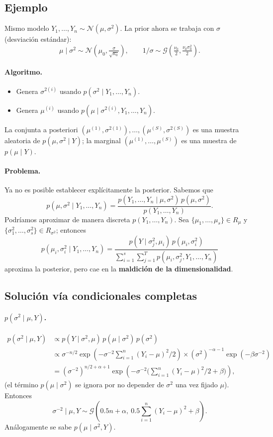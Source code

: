 \documentclass[11pt]{article}
\newcommand{\N}{\mathcal{N}}
\newcommand{\Ga}{\mathcal{G}}
\theoremstyle{definition}
\begin{document}
\subsection{Ejemplo}
Mismo modelo $Y_1,\dots,Y_n\sim\N(\mu,\sigma^2)$. La prior ahora se trabaja con $\sigma$ (desviación estándar):
\[
\mu\mid\sigma^2\sim\N\!\left(\mu_0,\tfrac{\sigma}{\sqrt{\kappa_0}}\right),\qquad
1/\sigma\sim\Ga\!\left(\tfrac{\nu_0}{2},\tfrac{\nu_0\sigma_0^2}{2}\right).
\]

\paragraph{Algoritmo.}
\begin{itemize}[leftmargin=2em]
  \item Genera $\sigma^{2(i)}$ usando $p(\sigma^2\mid Y_1,\dots,Y_n)$.
  \item Genera $\mu^{(i)}$ usando $p(\mu\mid\sigma^{2(i)},Y_1,\dots,Y_n)$.
\end{itemize}
La conjunta a posteriori $(\mu^{(1)},\sigma^{2(1)}),\dots,(\mu^{(S)},\sigma^{2(S)})$ es una muestra aleatoria de $p(\mu,\sigma^2\mid Y)$; la marginal $(\mu^{(1)},\dots,\mu^{(S)})$ es una muestra de $p(\mu\mid Y)$.

\paragraph{Problema.} Ya no es posible establecer explícitamente la posterior. Sabemos que
\[
p(\mu,\sigma^2\mid Y_1,\dots,Y_n)=\frac{p(Y_1,\dots,Y_n\mid\mu,\sigma^2)\,p(\mu,\sigma^2)}{p(Y_1,\dots,Y_n)}.
\]
Podríamos aproximar de manera discreta $p(Y_1,\dots,Y_n)$. Sea $\{\mu_1,\dots,\mu_s\}\in R_\mu$ y $\{\sigma_1^2,\dots,\sigma_s^2\}\in R_{\sigma^2}$; entonces
\[
p(\mu_i,\sigma_i^2\mid Y_1,\dots,Y_n)=\frac{p(Y\mid\sigma_j^2,\mu_i)\,p(\mu_i,\sigma_i^2)}{\sum_{i=1}^s\sum_{j=1}^T p(\mu_i,\sigma_j^2,Y_1,\dots,Y_n)}
\]
aproxima la posterior, pero cae en la \textbf{maldición de la dimensionalidad}.

\subsection{Solución vía condicionales completas}
\paragraph{$p(\sigma^2\mid\mu,Y)$.}
\begin{align*}
p(\sigma^2\mid\mu,Y)&\propto p(Y\mid\sigma^2,\mu)\,p(\mu\mid\sigma^2)\,p(\sigma^2)\\
&\propto\sigma^{-n/2}\exp\!\left(-\sigma^{-2}\sum_{i=1}^n(Y_i-\mu)^2/2\right)\times(\sigma^2)^{-\alpha-1}\exp(-\beta\sigma^{-2})\\
&=(\sigma^{-2})^{n/2+\alpha+1}\exp\!\left(-\sigma^{-2}\Big(\sum_{i=1}^n(Y_i-\mu)^2/2+\beta\Big)\right),
\end{align*}
(el término $p(\mu\mid\sigma^2)$ se ignora por no depender de $\sigma^2$ una vez fijado $\mu$). Entonces
\[
\sigma^{-2}\mid\mu,Y\sim\Ga\!\left(0.5n+\alpha,\ 0.5\sum_{i=1}^n(Y_i-\mu)^2+\beta\right).
\]
Análogamente se sabe $p(\mu\mid\sigma^2,Y)$.
\end{document}
